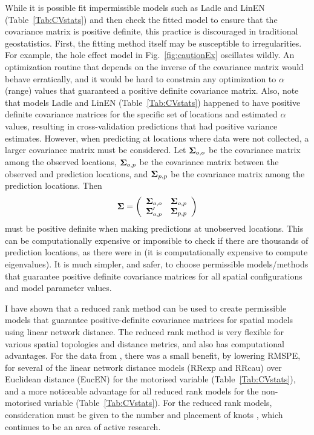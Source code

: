 \documentclass[11pt, titlepage]{article}\usepackage[]{graphicx}\usepackage[]{color}
\begin{document}
\begin{spacing}{1.9}
\begin{flushleft}
While it is possible fit impermissible models such as Ladle and LinEN (Table~\ref{Tab:CVstats}) and then check the fitted model to ensure that the covariance matrix is positive definite, this practice is discouraged in traditional geostatistics.  First, the fitting method itself may be susceptible to irregularities. For example, the hole effect model in Fig.~\ref{fig:cautionEx} oscillates wildly.  An optimization routine that depends on the inverse of the covariance matrix would behave erratically, and it would be hard to constrain any optimization to $\alpha$ (range) values that guaranteed a positive definite covariance matrix.  Also, note that models Ladle and LinEN (Table~\ref{Tab:CVstats}) happened to have positive definite covariance matrices for the specific set of locations and estimated $\alpha$ values, resulting in cross-validation predictions that had positive variance estimates.  However, when predicting at locations where data were not collected, a larger covariance matrix must be considered.  Let $\mbox{\boldmath $\Sigma$}_{o,o}$ be the covariance matrix among the observed locations, $\mbox{\boldmath $\Sigma$}_{o,p}$ be the covariance matrix between the observed and prediction locations, and $\mbox{\boldmath $\Sigma$}_{p,p}$  be the covariance matrix among the prediction locations. Then
\[
				\mbox{\boldmath $\Sigma$} = \left(
					\begin{array}{cc}
									\mbox{\boldmath $\Sigma$}_{o,o} & \mbox{\boldmath $\Sigma$}_{o,p} \\
									\mbox{\boldmath $\Sigma$}_{o,p}^{\prime} & \mbox{\boldmath $\Sigma$}_{p,p}
					\end{array}
				\right)
\]
must be positive definite when making predictions at unobserved locations. This can be computationally expensive or impossible to check if there are thousands of prediction locations, as there were in \citet{Ladl:Avga:Whea:Boyc:pred:2016} (it is computationally expensive to compute eigenvalues). It is much simpler, and safer, to choose permissible models/methods that guarantee positive definite covariance matrices for all spatial configurations and model parameter values. 

I have shown that a reduced rank method can be used to create permissible models that guarantee positive-definite covariance matrices for spatial models using linear network distance.  The reduced rank method is very flexible for various spatial topologies and distance metrics, and also has computational advantages.  For the data from \citet{Ladl:Avga:Whea:Boyc:pred:2016}, there was a small benefit, by lowering RMSPE, for several of the linear network distance models (RRexp and RRcau) over Euclidean distance (EucEN) for the motorised variable (Table~\ref{Tab:CVstats}), and a more noticeable advantage for all reduced rank models for the non-motorised variable (Table~\ref{Tab:CVstats}).  For the reduced rank models, consideration must be given to the number and placement of knots \citep{Rupp:Wand:Carr:semi:2003, Gelf:Bane:Finl:spat:2012}, which continues to be an area of active research.


\end{flushleft}
\end{spacing}
\end{document}
